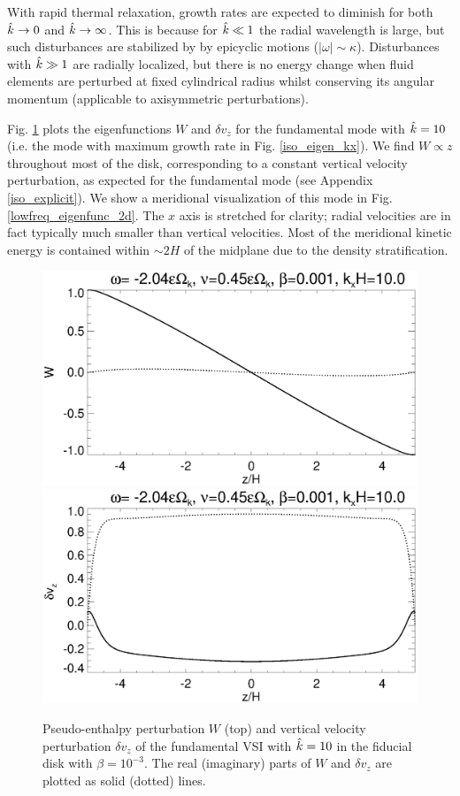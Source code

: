 With rapid thermal relaxation, growth rates are expected to diminish
for both $\hat{k}\to 0$ and $\hat{k}\to \infty$. This is because for
$\hat{k}\ll 1$ the radial wavelength is large, but such disturbances are 
stabilized by by epicyclic motions ($|\omega|\sim
\kappa$). Disturbances with $\hat{k}\gg 1$ are radially localized, but  
there is no energy change when fluid elements are perturbed at fixed
cylindrical radius whilst conserving its angular momentum (applicable
to axisymmetric perturbations).  
 
Fig. \ref{lowfreq_eigenfunc} plots the eigenfunctions $W$ and $\delta 
v_z$ for the fundamental mode with $\hat{k}=10$ (i.e. the mode with
maximum growth rate in Fig. \ref{iso_eigen_kx}). We find $W\propto z$
throughout most of the disk, corresponding to a constant vertical
velocity perturbation, as expected for the fundamental mode (see
Appendix \ref{iso_explicit}). We show a meridional visualization of
this mode in Fig. \ref{lowfreq_eigenfunc_2d}. The $x$ axis is
stretched for clarity; radial velocities are in fact typically much 
smaller than vertical velocities. Most of the meridional kinetic energy is
contained within $\sim 2H$ of the midplane due to the density 
stratification. 

\begin{figure}
  \includegraphics[width=\linewidth,clip=true,trim=0cm 1.75cm 0cm
  0cm]{figures/eigenvectorW_iso} 
  \includegraphics[width=\linewidth,clip=true,trim=0cm 0cm 0cm
  1cm]{figures/eigenvectorvz_iso}
  \caption{Pseudo-enthalpy perturbation $W$ (top) and vertical velocity
    perturbation $\delta v_z$ of the fundamental VSI with 
    $\hat{k}=10$ in the fiducial disk with $\beta=10^{-3}$. The real 
    (imaginary) parts of $W$ and $\delta v_z$ are plotted as solid
    (dotted) lines. 
    \label{lowfreq_eigenfunc}
  }
\end{figure}


